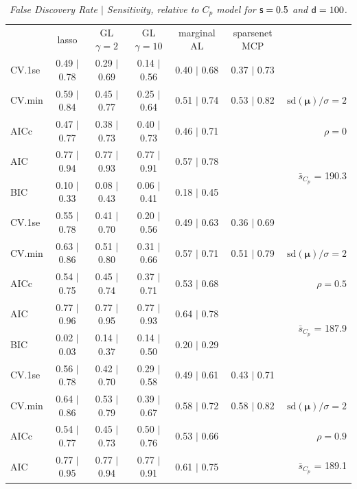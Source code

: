 \documentclass[12pt]{article}
\newcommand{\mr}[1]{\mathrm{#1}}
\newcommand{\bm}[1]{\mathbf{#1}}
\begin{document}
\begin{table}[p]\vspace{-.5cm}
\caption[l]{\it False Discovery Rate $\mid$ Sensitivity, relative to $C_p$ model  for ${\sf s}=0.5$ and ${\sf d}=100$.}
\vspace{-.5cm}
\small{}
\begin{center}
\begin{tabular}{l*{5}{c}|r}
 & lasso & GL $\gamma=2$ & GL $\gamma=10$ & marginal AL & sparsenet MCP  & \\
 \cline{1-7}
CV.1se & 0.49 $\mid$ 0.78 & 0.29 $\mid$ 0.69 & 0.14 $\mid$ 0.56 & 0.40 $\mid$ 0.68 & 0.37 $\mid$ 0.73 &\\
CV.min & 0.59 $\mid$ 0.84 & 0.45 $\mid$ 0.77 & 0.25 $\mid$ 0.64 & 0.51 $\mid$ 0.74 & 0.53 $\mid$ 0.82 &  $\mr{sd}(\bm{\mu})/\sigma=2$ \\
AICc & 0.47 $\mid$ 0.77 & 0.38 $\mid$ 0.73 & 0.40 $\mid$ 0.73 & 0.46 $\mid$ 0.71 & & $\rho=0$ \\
AIC & 0.77 $\mid$ 0.94 & 0.77 $\mid$ 0.93 & 0.77 $\mid$ 0.91 & 0.57 $\mid$ 0.78 & & \multirow{2}{*}{$\bar{s}_{C_p}$ = 190.3} \\
BIC & 0.10 $\mid$ 0.33 & 0.08 $\mid$ 0.43 & 0.06 $\mid$ 0.41 & 0.18 $\mid$ 0.45 & & \\
 \hline 
CV.1se & 0.55 $\mid$ 0.78 & 0.41 $\mid$ 0.70 & 0.20 $\mid$ 0.56 & 0.49 $\mid$ 0.63 & 0.36 $\mid$ 0.69 &\\
CV.min & 0.63 $\mid$ 0.86 & 0.51 $\mid$ 0.80 & 0.31 $\mid$ 0.66 & 0.57 $\mid$ 0.71 & 0.51 $\mid$ 0.79 &  $\mr{sd}(\bm{\mu})/\sigma=2$ \\
AICc & 0.54 $\mid$ 0.75 & 0.45 $\mid$ 0.74 & 0.37 $\mid$ 0.71 & 0.53 $\mid$ 0.68 & & $\rho=0.5$ \\
AIC & 0.77 $\mid$ 0.96 & 0.77 $\mid$ 0.95 & 0.77 $\mid$ 0.93 & 0.64 $\mid$ 0.78 & & \multirow{2}{*}{$\bar{s}_{C_p}$ = 187.9} \\
BIC & 0.02 $\mid$ 0.03 & 0.14 $\mid$ 0.37 & 0.14 $\mid$ 0.50 & 0.20 $\mid$ 0.29 & & \\
 \hline 
CV.1se & 0.56 $\mid$ 0.78 & 0.42 $\mid$ 0.70 & 0.29 $\mid$ 0.58 & 0.49 $\mid$ 0.61 & 0.43 $\mid$ 0.71 &\\
CV.min & 0.64 $\mid$ 0.86 & 0.53 $\mid$ 0.79 & 0.39 $\mid$ 0.67 & 0.58 $\mid$ 0.72 & 0.58 $\mid$ 0.82 &  $\mr{sd}(\bm{\mu})/\sigma=2$ \\
AICc & 0.54 $\mid$ 0.77 & 0.45 $\mid$ 0.73 & 0.50 $\mid$ 0.76 & 0.53 $\mid$ 0.66 & & $\rho=0.9$ \\
AIC & 0.77 $\mid$ 0.95 & 0.77 $\mid$ 0.94 & 0.77 $\mid$ 0.91 & 0.61 $\mid$ 0.75 & & \multirow{2}{*}{$\bar{s}_{C_p}$ = 189.1} \\

\end{tabular}
\end{center}
\end{table}
\end{document}
